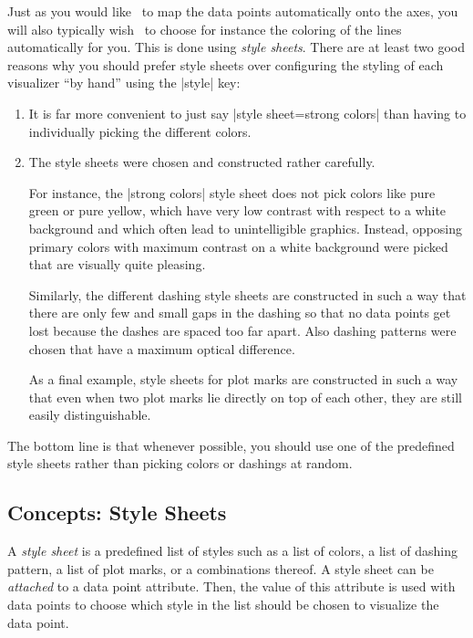 Just as you would like \tikzname\ to map the data points automatically onto the
axes, you will also typically wish \tikzname\ to choose for instance the
coloring of the lines automatically for you. This is done using \emph{style
sheets}. There are at least two good reasons why you should prefer style sheets
over configuring the styling of each visualizer ``by hand'' using the |style|
key:
%
\begin{enumerate}
    \item It is far more convenient to just say |style sheet=strong colors|
        than having to individually picking the different colors.
    \item The style sheets were chosen and constructed rather carefully.

        For instance, the |strong colors| style sheet does not pick colors like
        pure green or pure yellow, which have very low contrast with respect to
        a white background and which often lead to unintelligible graphics.
        Instead, opposing primary colors with maximum contrast on a white
        background were picked that are visually quite pleasing.

        Similarly, the different dashing style sheets are constructed in such a
        way that there are only few and small gaps in the dashing so that no
        data points get lost because the dashes are spaced too far apart. Also
        dashing patterns were chosen that have a maximum optical difference.

        As a final example, style sheets for plot marks are constructed in such
        a way that even when two plot marks lie directly on top of each other,
        they are still easily distinguishable.
\end{enumerate}
%
The bottom line is that whenever possible, you should use one of the predefined
style sheets rather than picking colors or dashings at random.


\subsection{Concepts: Style Sheets}

A \emph{style sheet} is a predefined list of styles such as a list of colors, a
list of dashing pattern, a list of plot marks, or a combinations thereof. A
style sheet can be \emph{attached} to a data point attribute. Then, the value
of this attribute is used with data points to choose which style in the list
should be chosen to visualize the data point.

